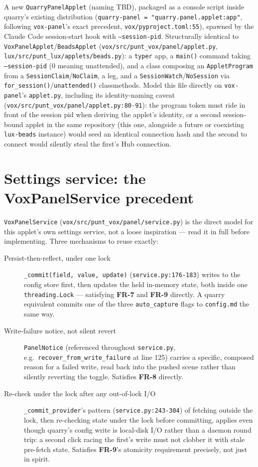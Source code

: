 \documentclass[a4paper,11pt]{report}
\newcommand{\fr}[1]{\textbf{FR-#1}}
\begin{document}
A new \texttt{QuarryPanelApplet} (naming TBD), packaged as a console
script inside quarry's existing distribution
(\texttt{quarry-panel = "quarry.panel.applet:app"}, following
\texttt{vox-panel}'s exact precedent, \texttt{vox/pyproject.toml:55}),
spawned by the Claude Code session-start hook with
\texttt{--session-pid}. Structurally identical to
\texttt{VoxPanelApplet}/\texttt{BeadsApplet}
(\texttt{vox/src/punt\_vox/panel/applet.py},
\texttt{lux/src/punt\_lux/applets/beads.py}): a \texttt{typer} app, a
\texttt{main()} command taking \texttt{--session-pid} (0 meaning
unattended), and a class composing an \texttt{AppletProgram} from a
\texttt{SessionClaim}/\texttt{NoClaim}, a leg, and a
\texttt{SessionWatch}/\texttt{NoSession} via
\texttt{for\_session()}/\texttt{unattended()} classmethods. Model this
file directly on \texttt{vox-panel}'s \texttt{applet.py}, including its
identity-naming caveat (\texttt{vox/src/punt\_vox/panel/applet.py:80-91}):
the program token must ride in front of the session pid when deriving
the applet's identity, or a second session-bound applet in the same
repository (this one, alongside a future or coexisting \texttt{lux-beads}
instance) would seed an identical connection hash and the second to
connect would silently steal the first's Hub connection.

\section{Settings service: the VoxPanelService precedent}

\texttt{VoxPanelService} (\texttt{vox/src/punt\_vox/panel/service.py}) is
the direct model for this applet's own settings service, not a loose
inspiration --- read it in full before implementing. Three mechanisms to
reuse exactly:

\begin{description}
  \item[Persist-then-reflect, under one lock] \texttt{\_commit(field,
    value, update)} (\texttt{service.py:176-183}) writes to the config
    store first, then updates the held in-memory state, both inside one
    \texttt{threading.Lock} --- satisfying \fr{7} and \fr{9} directly. A
    quarry equivalent commits one of the three \texttt{auto\_capture}
    flags to \texttt{config.md} the same way.
  \item[Write-failure notice, not silent revert] \texttt{PanelNotice}
    (referenced throughout \texttt{service.py}, e.g.\
    \texttt{recover\_from\_write\_failure} at line 125) carries a
    specific, composed reason for a failed write, read back into the
    pushed scene rather than silently reverting the toggle. Satisfies
    \fr{8} directly.
  \item[Re-check under the lock after any out-of-lock I/O]
    \texttt{\_commit\_provider}'s pattern (\texttt{service.py:243-304}) of
    fetching outside the lock, then re-checking state under the lock
    before committing, applies even though quarry's config write is
    local-disk I/O rather than a daemon round trip: a second click
    racing the first's write must not clobber it with stale
    pre-fetch state. Satisfies \fr{9}'s atomicity requirement precisely,
    not just in spirit.
\end{description}
\end{document}
